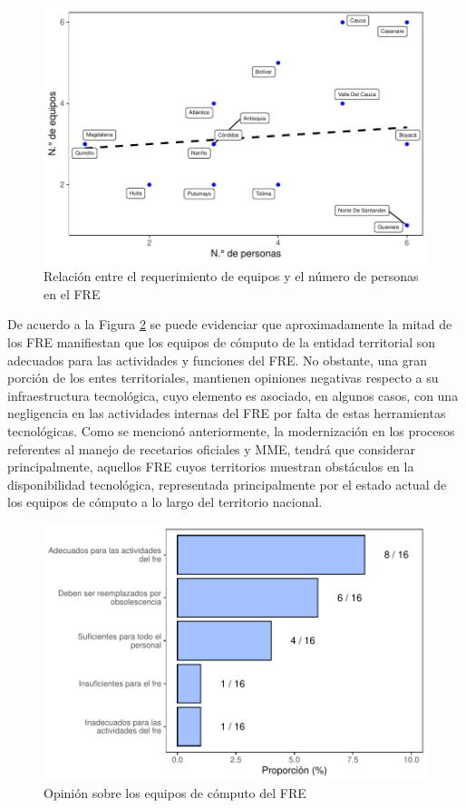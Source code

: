 \documentclass[
]{book}
\begin{document}
\begin{figure}
\includegraphics[width=0.85\linewidth]{InformeFinal_files/figure-latex/RelacionEquiposPersonal-1} \caption{Relación entre el requerimiento de equipos y el número de personas en el FRE}\label{fig:RelacionEquiposPersonal}
\end{figure}

De acuerdo a la Figura \ref{fig:OpinionEquiposComputo} se puede evidenciar que aproximadamente la mitad de los FRE manifiestan que los equipos de cómputo de la entidad territorial son adecuados para las actividades y funciones del FRE. No obstante, una gran porción de los entes territoriales, mantienen opiniones negativas respecto a su infraestructura tecnológica, cuyo elemento es asociado, en algunos casos, con una negligencia en las actividades internas del FRE por falta de estas herramientas tecnológicas. Como se mencionó anteriormente, la modernización en los procesos referentes al manejo de recetarios oficiales y MME, tendrá que considerar principalmente, aquellos FRE cuyos territorios muestran obstáculos en la disponibilidad tecnológica, representada principalmente por el estado actual de los equipos de cómputo a lo largo del territorio nacional.

\begin{figure}
\includegraphics[width=0.85\linewidth]{InformeFinal_files/figure-latex/OpinionEquiposComputo-1} \caption{Opinión sobre los equipos de cómputo del FRE}\label{fig:OpinionEquiposComputo}
\end{figure}
\end{document}
